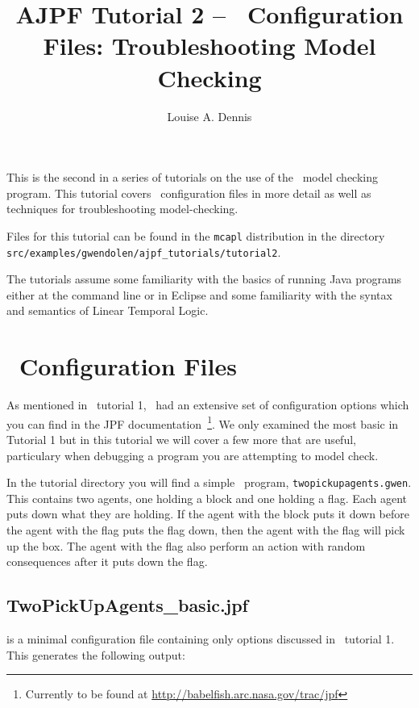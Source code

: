 \documentclass[a4]{article}
\author{Louise A. Dennis}
\title{AJPF Tutorial 2 -- \jpf\ Configuration Files: Troubleshooting Model Checking}
\begin{document}
\maketitle
This is the second in a series of tutorials on the use of the \ajpf\ model checking program.  This tutorial covers \jpf\ configuration files in more detail as well as techniques for troubleshooting model-checking.

Files for this tutorial can be found in the \texttt{mcapl} distribution in the directory \texttt{src/examples/gwendolen/ajpf\_tutorials/tutorial2}.

The tutorials assume some familiarity with the basics of running Java programs either at the command line or in Eclipse and some familiarity with the syntax and semantics of Linear Temporal Logic.

\section{\jpf\ Configuration Files}
As mentioned in \ajpf\ tutorial 1, \jpf\ had an extensive set of configuration options which you can find in the JPF documentation~\footnote{Currently to be found at \url{http://babelfish.arc.nasa.gov/trac/jpf}}. We only examined the most basic in Tutorial 1 but in this tutorial we will cover a few more that are useful, particulary when debugging a program you are attempting to model check.

In the tutorial directory you will find a simple \gwendolen\ program, \texttt{twopickupagents.gwen}.  This contains two agents, one holding a block and one holding a flag.  Each agent puts down what they are holding.  If the agent with the block puts it down before the agent with the flag puts the flag down, then the agent with the flag will pick up the box.  The agent with the flag also perform an action with random consequences after it puts down the flag.

\subsection{TwoPickUpAgents\_basic.jpf} is a minimal configuration file containing only options discussed in \ajpf\ tutorial 1.  This generates the following output:
\end{document}
